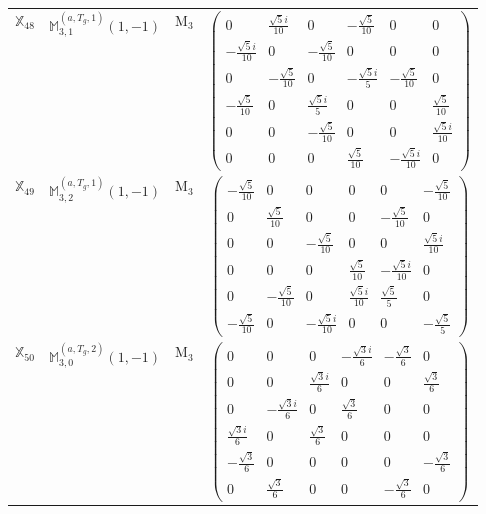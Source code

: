 \documentclass[fleqn,10pt,landscape]{article}
\begin{document}
\begin{itemize}
\begin{center}
\begin{longtable}{c|c|c|c}
$ \mathbb{X}_{48} $ & $\mathbb{M}_{3,1}^{(a,T_{g},1)}(1,-1)$ & M$_{3}$ & $\begin{pmatrix} 0 & \frac{\sqrt{5} i}{10} & 0 & - \frac{\sqrt{5}}{10} & 0 & 0 \\ - \frac{\sqrt{5} i}{10} & 0 & - \frac{\sqrt{5}}{10} & 0 & 0 & 0 \\ 0 & - \frac{\sqrt{5}}{10} & 0 & - \frac{\sqrt{5} i}{5} & - \frac{\sqrt{5}}{10} & 0 \\ - \frac{\sqrt{5}}{10} & 0 & \frac{\sqrt{5} i}{5} & 0 & 0 & \frac{\sqrt{5}}{10} \\ 0 & 0 & - \frac{\sqrt{5}}{10} & 0 & 0 & \frac{\sqrt{5} i}{10} \\ 0 & 0 & 0 & \frac{\sqrt{5}}{10} & - \frac{\sqrt{5} i}{10} & 0 \end{pmatrix}$ \\
$ \mathbb{X}_{49} $ & $\mathbb{M}_{3,2}^{(a,T_{g},1)}(1,-1)$ & M$_{3}$ & $\begin{pmatrix} - \frac{\sqrt{5}}{10} & 0 & 0 & 0 & 0 & - \frac{\sqrt{5}}{10} \\ 0 & \frac{\sqrt{5}}{10} & 0 & 0 & - \frac{\sqrt{5}}{10} & 0 \\ 0 & 0 & - \frac{\sqrt{5}}{10} & 0 & 0 & \frac{\sqrt{5} i}{10} \\ 0 & 0 & 0 & \frac{\sqrt{5}}{10} & - \frac{\sqrt{5} i}{10} & 0 \\ 0 & - \frac{\sqrt{5}}{10} & 0 & \frac{\sqrt{5} i}{10} & \frac{\sqrt{5}}{5} & 0 \\ - \frac{\sqrt{5}}{10} & 0 & - \frac{\sqrt{5} i}{10} & 0 & 0 & - \frac{\sqrt{5}}{5} \end{pmatrix}$ \\
$ \mathbb{X}_{50} $ & $\mathbb{M}_{3,0}^{(a,T_{g},2)}(1,-1)$ & M$_{3}$ & $\begin{pmatrix} 0 & 0 & 0 & - \frac{\sqrt{3} i}{6} & - \frac{\sqrt{3}}{6} & 0 \\ 0 & 0 & \frac{\sqrt{3} i}{6} & 0 & 0 & \frac{\sqrt{3}}{6} \\ 0 & - \frac{\sqrt{3} i}{6} & 0 & \frac{\sqrt{3}}{6} & 0 & 0 \\ \frac{\sqrt{3} i}{6} & 0 & \frac{\sqrt{3}}{6} & 0 & 0 & 0 \\ - \frac{\sqrt{3}}{6} & 0 & 0 & 0 & 0 & - \frac{\sqrt{3}}{6} \\ 0 & \frac{\sqrt{3}}{6} & 0 & 0 & - \frac{\sqrt{3}}{6} & 0 \end{pmatrix}$ \\

\end{longtable}
\end{center}
\end{itemize}
\end{document}
